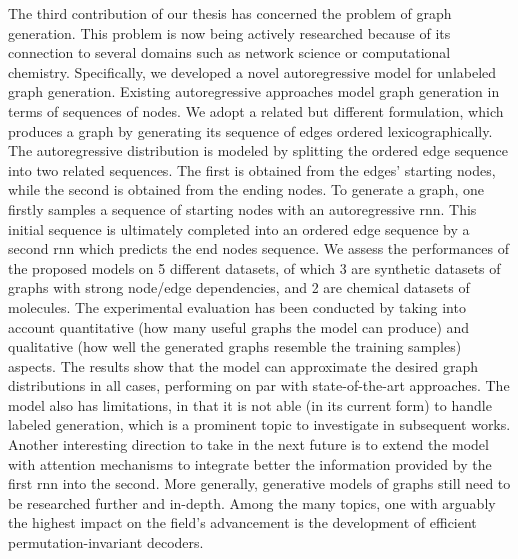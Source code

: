 The third contribution of our thesis has concerned the problem of graph generation. This problem is now being actively researched because of its connection to several domains such as network science or computational chemistry. Specifically, we developed a novel autoregressive model for unlabeled graph generation. Existing autoregressive approaches model graph generation in terms of sequences of nodes. We adopt a related but different formulation, which produces a graph by generating its sequence of edges ordered lexicographically. The autoregressive distribution is modeled by splitting the ordered edge sequence into two related sequences. The first is obtained from the edges' starting nodes, while the second is obtained from the ending nodes. To generate a graph, one firstly samples a sequence of starting nodes with an autoregressive \gls{rnn}. This initial sequence is ultimately completed into an ordered edge sequence by a second \gls{rnn} which predicts the end nodes sequence. We assess the performances of the proposed models on 5 different datasets, of which 3 are synthetic datasets of graphs with strong node/edge dependencies, and 2 are chemical datasets of molecules. The experimental evaluation has been conducted by taking into account quantitative (\ie how many useful graphs the model can produce) and qualitative (\ie how well the generated graphs resemble the training samples) aspects. The results show that the model can approximate the desired graph distributions in all cases, performing on par with state-of-the-art approaches. The model also has limitations, in that it is not able (in its current form) to handle labeled generation, which is a prominent topic to investigate in subsequent works. Another interesting direction to take in the next future is to extend the model with attention mechanisms to integrate better the information provided by the first \gls{rnn} into the second. More generally, generative models of graphs still need to be researched further and in-depth. Among the many topics, one with arguably the highest impact on the field's advancement is the development of efficient permutation-invariant decoders.
\vspace{1em}

